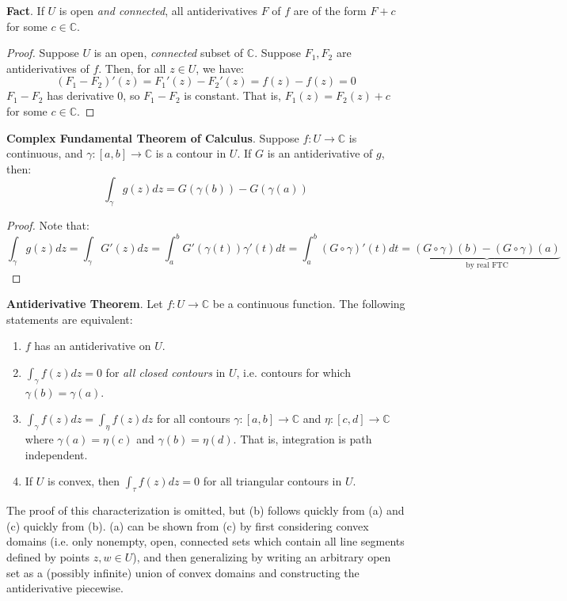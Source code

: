 \textbf{Fact}. If $U$ is open \textit{and connected}, all antiderivatives $F$ of $f$ are of the form $F+c$ for some $c\in\mathbb{C}$.
\begin{proof}
    Suppose $U$ is an open, \textit{connected} subset of $\mathbb{C}$. Suppose $F_1,F_2$ are antiderivatives of $f$. Then, for all $z\in U$, we have: \[(F_1-F_2)'(z) = F_1'(z) - F_2'(z) = f(z)-f(z) = 0\] $F_1-F_2$ has derivative $0$, so $F_1-F_2$ is constant. That is, $F_1(z) = F_2(z) + c$ for some $c\in\mathbb{C}$.
\end{proof}

\textbf{Complex Fundamental Theorem of Calculus}. Suppose $f:U\to\mathbb{C}$ is continuous, and $\gamma:[a,b]\to\mathbb{C}$ is a contour in $U$. If $G$ is an antiderivative of $g$, then: \[\int_\gamma g(z)dz = G(\gamma(b)) - G(\gamma(a))\] 
\vspace{-3em}
\begin{proof}
Note that: \[\int_\gamma g(z)dz = \int_\gamma G'(z)dz =\int_a^b G'(\gamma(t))\gamma'(t)dt = \int_a^b (G\circ \gamma)'(t)dt = \underbrace{(G\circ\gamma)(b) - (G\circ\gamma)(a)}_\text{by real FTC}\]
\end{proof}

\begin{framed}
    \textbf{Antiderivative Theorem}. Let $f:U\to\mathbb{C}$ be a continuous function. The following statements are equivalent:\vspace{-1em} \begin{enumerate}
        \item[(a)] $f$ has an antiderivative on $U$.
        \item[(b)] $\int_\gamma f(z)dz = 0$ for \textit{all closed contours} in $U$, i.e. contours for which $\gamma(b)=\gamma(a)$.
        \item[(c)] $\int_\gamma f(z)dz = \int_\eta f(z)dz$ for all contours $\gamma:[a,b]\to\mathbb{C}$ and $\eta:[c,d]\to\mathbb{C}$ where $\gamma(a)=\eta(c)$ and $\gamma(b)=\eta(d)$. That is, integration is path independent.
        \item[(d)] If $U$ is convex, then $\int_\tau f(z)dz = 0$ for all triangular contours in $U$.
    \end{enumerate}

    The proof of this characterization is omitted, but (b) follows quickly from (a) and (c) quickly from (b). (a) can be shown from (c) by first considering convex domains (i.e. only nonempty, open, connected sets which contain all line segments defined by points $z,w\in U$), and then generalizing by writing an arbitrary open set as a (possibly infinite) union of convex domains and constructing the antiderivative piecewise.
\end{framed}

